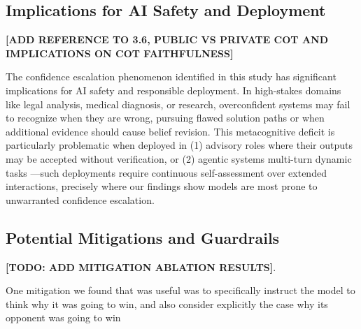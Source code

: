 \documentclass{article}
\begin{document}
\subsection{Implications for AI Safety and Deployment}

\textbf{[ADD REFERENCE TO 3.6, PUBLIC VS PRIVATE COT AND IMPLICATIONS ON COT FAITHFULNESS]}

The confidence escalation phenomenon identified in this study has significant implications for AI safety and responsible deployment. In high-stakes domains like legal analysis, medical diagnosis, or research, overconfident systems may fail to recognize when they are wrong, pursuing flawed solution paths or when additional evidence should cause belief revision. This metacognitive deficit is particularly problematic when deployed in (1) advisory roles where their outputs may be accepted without verification, or (2) agentic systems multi-turn dynamic tasks —such deployments require continuous self-assessment over extended interactions, precisely where our findings show models are most prone to unwarranted confidence escalation.

\subsection{Potential Mitigations and Guardrails}

\textbf{[TODO: ADD MITIGATION ABLATION RESULTS]}.

One mitigation we found that was useful was to specifically instruct the model to think why it was going to win, and also consider explicitly the case why its opponent was going to win
\end{document}
